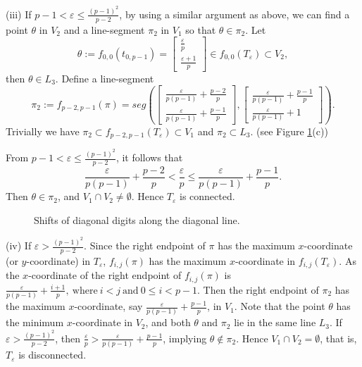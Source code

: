 \documentclass[12pt, reqno]{amsart}
\numberwithin{equation}{section}
\begin{document}
(iii) If $p-1<\varepsilon\leq\frac{(p-1)^2}{p-2}$, by using a similar argument as above, we can find a point $\theta$ in $V_2$ and a line-segment $\pi_2$ in $V_1$ so that $\theta\in\pi_2$. Let $$\theta:=f_{0,0}(t_{0,p-1})=\left[\begin{array}{c}\frac{\varepsilon}{p}\\\frac{\varepsilon+1}p\end{array}\right]\in f_{0,0}(T_{\varepsilon})\subset V_{2},$$
then $\theta\in L_{3}.$ Define a line-segment $$\pi_2:=f_{p-2,p-1}(\pi)
=seg\left(\left[\begin{array}{c}\frac{\varepsilon}{p(p-1)}+\frac{p-2}p\\ \frac{\varepsilon}{p(p-1)}+\frac{p-1}p\end{array}\right],\left[\begin{array}{c}\frac{\varepsilon}{p(p-1)}+\frac{p-1}p\\ \frac{\varepsilon}{p(p-1)}+1\end{array}\right]\right).$$
Trivially we have $\pi_2\subset f_{p-2,p-1}(T_\varepsilon)\subset V_{1}$ and $\pi_2\subset L_{3}$. (see Figure \ref{fig.2}(c))

From $p-1<\varepsilon\leq\frac{(p-1)^2}{p-2}$, it follows that
$$\frac{\varepsilon}{p(p-1)}+\frac{p-2}{p}<\frac{\varepsilon}{p}\leq\frac{\varepsilon}{p(p-1)}+\frac{p-1}{p}.$$
Then $\theta\in\pi_2$, and $V_{1}\cap V_{2}\neq\emptyset$. Hence $T_{\varepsilon}$ is connected.





\begin{figure}[h]
	\centering
	\quad
	\quad
	\caption{Shifts of diagonal digits along the diagonal line.}\label{fig.2}
\end{figure}






(iv) If $\varepsilon>\frac{(p-1)^2}{p-2}$. Since the right endpoint of $\pi$ has the maximum $x$-coordinate (or $y$-coordinate) in $T_{\varepsilon}$,  $f_{i,j}(\pi)$ has the maximum $x$-coordinate in $f_{i,j}(T_{\varepsilon})$. As the $x$-coordinate of the right endpoint of $f_{i,j}(\pi)$ is $\frac{\varepsilon}{p(p-1)}+\frac{i+1}{p},\ \text{where}\ i<j\ \text{and}\ 0\leq i<p-1$. Then  the right endpoint of $\pi_2$ has the maximum $x$-coordinate, say $\frac{\varepsilon}{p(p-1)}+\frac{p-1}{p}$,  in $V_1$. Note that the point $\theta$ has the minimum $x$-coordinate in $V_2$, and both $\theta$ and $\pi_2$ lie in the same line $L_3$. If  $\varepsilon>\frac{(p-1)^2}{p-2}$, then $\frac{\varepsilon}{p}>\frac{\varepsilon}{p(p-1)}+\frac{p-1}{p}$, implying $\theta\not\in\pi_2$. Hence $V_1\cap V_2=\emptyset$, that is, $T_{\varepsilon}$ is disconnected.
\end{document}
